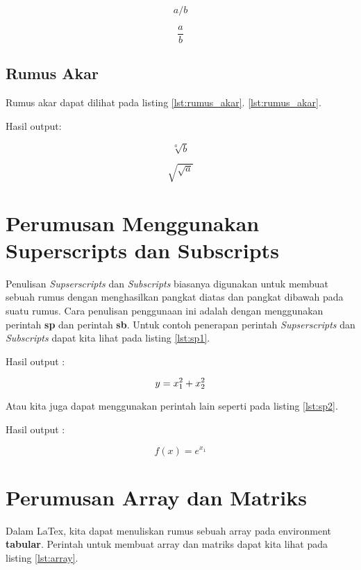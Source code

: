 $$ a/b$$

$$ \frac {a}{b}$$

\subsection{Rumus Akar}
Rumus akar dapat dilihat pada listing \ref{lst:rumus_akar}.
\ref{lst:rumus_akar}.

Hasil output:

$$ \sqrt[a]{b}$$

$$ \sqrt{\sqrt{a}}$$

\section{Perumusan Menggunakan Superscripts dan Subscripts}
Penulisan \textit{Supserscripts} dan \textit{Subscripts} biasanya digunakan untuk membuat sebuah rumus dengan menghasilkan pangkat diatas dan pangkat dibawah pada suatu rumus. Cara penulisan penggunaan ini adalah dengan menggunakan perintah \textbf{sp} dan perintah \textbf{sb}. Untuk contoh penerapan perintah \textit{Supserscripts} dan \textit{Subscripts} dapat kita lihat pada listing \ref{lst:sp1}.



Hasil output :

\begin{displaymath}
y = x\sb{1}\sp{2} + x\sb{2}\sp{2}
\end{displaymath}

Atau kita juga dapat menggunakan perintah lain seperti pada listing \ref{lst:sp2}.



Hasil output :

\begin{displaymath}
f(x) = e^{x_1}
\end{displaymath}

\section {Perumusan Array dan Matriks}
Dalam LaTex, kita dapat menuliskan rumus sebuah array pada environment \textbf{tabular}. Perintah untuk membuat array dan matriks dapat kita lihat pada listing \ref{lst:array}.


